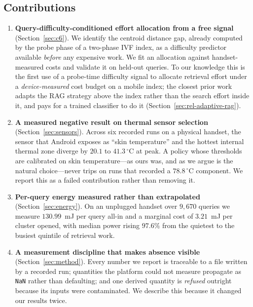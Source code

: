 \documentclass[conference]{IEEEtran}
\begin{document}
\subsection*{Contributions}

\begin{enumerate}
\item \textbf{Query-difficulty-conditioned effort allocation from a free
signal} (Section~\ref{sec:c6}). We identify the centroid distance gap, already
computed by the probe phase of a two-phase IVF index, as a difficulty predictor
available \emph{before} any expensive work. We fit an allocation against
handset-measured costs and validate it on held-out queries. To our knowledge
this is the first use of a probe-time difficulty signal to allocate retrieval
effort under a \emph{device-measured} cost budget on a mobile index; the
closest prior work adapts the RAG strategy above the index rather than the
search effort inside it, and pays for a trained classifier to do it
(Section~\ref{sec:rel-adaptive-rag}).

\item \textbf{A measured negative result on thermal sensor selection}
(Section~\ref{sec:sensors}). Across six recorded runs on a physical handset,
the sensor that Android exposes as ``skin temperature'' and the hottest
internal thermal zone diverge by $20.1$ to $41.3\,^{\circ}$C at peak. A policy
whose thresholds are calibrated on skin temperature---as ours was, and as we
argue is the natural choice---never trips on runs that recorded a
$78.8\,^{\circ}$C component. We report this as a failed contribution rather
than removing it.

\item \textbf{Per-query energy measured rather than extrapolated}
(Section~\ref{sec:energy}). On an unplugged handset over $9{,}670$ queries we
measure $130.99$~mJ per query all-in and a marginal cost of $3.21$~mJ per
cluster opened, with median power rising $97.6\%$ from the quietest to the
busiest quintile of retrieval work.

\item \textbf{A measurement discipline that makes absence visible}
(Section~\ref{sec:method}). Every number we report is traceable to a file
written by a recorded run; quantities the platform could not measure propagate
as \texttt{NaN} rather than defaulting; and one derived quantity is
\emph{refused} outright because its inputs were contaminated. We describe this
because it changed our results twice.
\end{enumerate}
\end{document}
